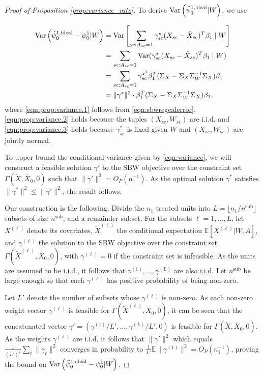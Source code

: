 \begin{proof}[Proof of Proposition \ref{prop:variance_rate}] 
To derive $\operatorname{Var}\left(\hat{\psi}_0^{1,\textup{ideal}} | W\right)$, we use

\begin{align}
\operatorname{Var}\left(\hat{\psi}_0^{1,\textup{ideal}} - \psi_0^1 | W\right) &= \operatorname{Var}\left[\sum_{sc: A_{sc} = 1}\gamma_{sc}^\star(X_{sc} - \tilde{X}_{sc})^T\beta_1 \mid W\right] \label{eqn:prop:variance.1}\\
 &= \sum_{sc: A_{sc} = 1} \operatorname{Var}(\gamma_{sc}^\star(X_{sc} - \tilde{X}_{sc})^T\beta_1 \mid W) \label{eqn:prop:variance.2}\\
 &= \sum_{sc: A_{sc} = 1} \gamma_{sc}^{\star^2}\beta_1^T(\Sigma_{X} - \Sigma_{X}\Sigma_{W}^{-1}\Sigma_{X})\beta_1  \label{eqn:prop:variance.3}\\
& = \|\gamma^*\|^2 \cdot \beta_1^T(\Sigma_{X} - \Sigma_{X}\Sigma_{W}^{-1}\Sigma_{X})\beta_1,  \label{eqn:variance}
\end{align}
%
where \eqref{eqn:prop:variance.1} follows from \eqref{eqn:sbwregcalerror}, \eqref{eqn:prop:variance.2} holds because the tuples $(X_{sc}, W_{sc})$ are i.i.d, and \eqref{eqn:prop:variance.3} holds because $\gamma_{sc}^*$ is fixed given $W$ and $(X_{sc}, W_{sc})$ are jointly normal. 

To upper bound the conditional variance given by \eqref{eqn:variance}, we will construct a feasible solution $\gamma'$ to the SBW objective over the constraint set $\Gamma(\tilde{X}, \bar{X}_0, 0)$ such that $\|\gamma'\|^2 = O_P(n_1^{-1})$. As the optimal solution $\gamma^*$ satisfies $\|\gamma^*\|^2 \leq \|\gamma'\|^2$, the result follows.

Our construction is the following. Divide the $n_1$ treated units into $L = \lfloor n_1/n^{\text{sub}} \rfloor$ subsets of size $n^{\text{sub}}$, and a remainder subset. For the subsets $\ell=1,\ldots,L$, let $X^{(\ell)}$ denote its covariates, $\tilde{X}^{(\ell)}$ the conditional expectation $\mathbb{E}[X^{(\ell)}|W, A]$, and  $\gamma^{(\ell)}$ the solution to the SBW objective over the constraint set $\Gamma(\tilde{X}^{(\ell)}, \bar{X}_0, 0)$, with $\gamma^{(\ell)}=0$ if the constraint set is infeasible. As the units are assumed to be i.i.d., it follows that $\gamma^{(1)}, \ldots, \gamma^{(L)}$ are also i.i.d. Let $n^{\text{sub}}$ be large enough so that each $\gamma^{(\ell)}$ has positive probability of being non-zero. 

Let $L'$ denote the number of subsets whose $\gamma^{(\ell)}$ is non-zero. As each non-zero weight vector $\gamma^{(\ell)}$ is feasible for $\Gamma(\tilde{X}^{(\ell)}, \bar{X}_0, 0)$, it can be seen that the concatenated vector $\gamma' = (\gamma^{(1)}/L', \ldots, \gamma^{(L)}/L', 0)$ is feasible for $\Gamma(\tilde{X},\bar{X}_0,0)$. As the weights $\gamma^{(\ell)}$ are i.i.d, it follows that $\| \gamma'\|^2$ which equals $\frac{1}{(L')^2} \sum_\ell \|\gamma_\ell\|^2$  converges in probability to $\frac{1}{L'} \mathbb{E}\|\gamma^{(1)}\|^2 = O_P(n_1^{-1})$, proving the bound on $\operatorname{Var}\left(\hat{\psi}_0^{1,\textup{ideal}} - \psi_0^1 | W\right)$.


\end{proof}
